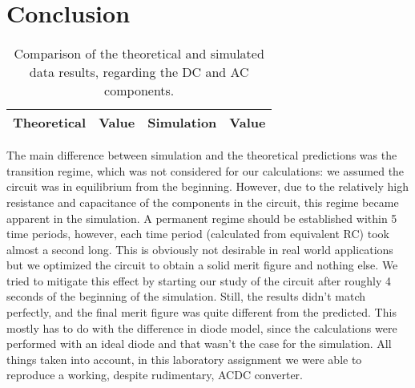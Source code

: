 \newpage
\section{Conclusion}
\label{sec:conclusion}
\begin{table}[!h]
  \centering
  \begin{tabular}{c c c c}
    \hline    
    {\bf Theoretical} & {\bf Value} & {\bf Simulation} & {\bf Value}\\ \hline
     
  \end{tabular}
  \caption{Comparison of the theoretical and simulated data results, regarding the DC and AC components.}
  \label{tab:comp}
\end{table}
The main difference between simulation and the theoretical predictions was the transition regime, which was not considered for our calculations: we assumed the circuit was in equilibrium from the beginning. However, due to the relatively high resistance and capacitance of the components in the circuit, this regime became apparent in the simulation. A permanent regime should be established within 5 time periods, however, each time period (calculated from equivalent RC) took almost a second long. This is obviously not desirable in real world applications but we optimized the circuit to obtain a solid merit figure and nothing else.
We tried to mitigate this effect by starting our study of the circuit after roughly 4 seconds of the beginning of the simulation. Still, the results didn't match perfectly, and the final merit figure was quite different from the predicted. This mostly has to do with the difference in diode model, since the calculations were performed with an ideal diode and that wasn't the case for the simulation.
All things taken into account, in this laboratory assignment we were able to reproduce a working, despite rudimentary, ACDC converter. 
